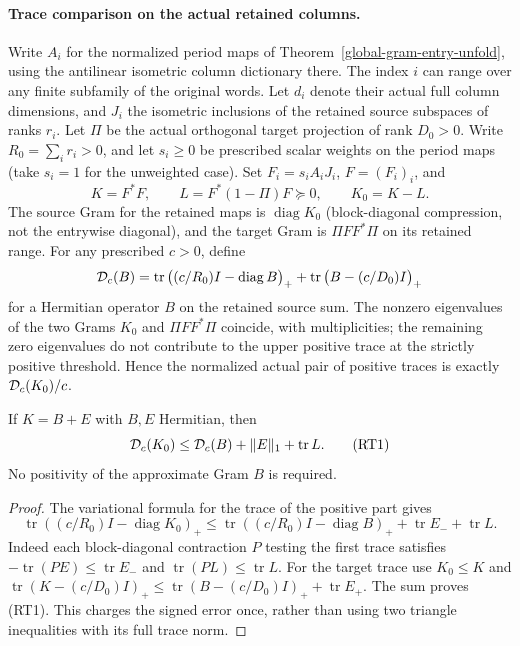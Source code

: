 \paragraph{Trace comparison on the actual retained columns.}
Write \(A_i\) for the normalized period maps of
Theorem~\ref{global-gram-entry-unfold}, using the antilinear
isometric column dictionary there. The index \(i\) can range
over any finite subfamily of the original words.
Let \(d_i\) denote their actual full column dimensions,
and \(J_i\) the isometric inclusions of the retained
source subspaces of ranks \(r_i\). Let \(\Pi\) be the
actual orthogonal target projection of rank \(D_0>0\).
Write \(R_0=\sum_i r_i>0\), and let \(s_i\ge0\) be
prescribed scalar weights on the period maps (take
\(s_i=1\) for the unweighted case). Set
\(F_i=s_i A_iJ_i\), \(F=(F_i)_i\), and
\[
 K=F^*F,\qquad L=F^*(1-\Pi)F\succeq0,\qquad
 K_0=K-L .
\]
The source Gram for the retained maps is \(\operatorname{diag}K_0\)
(block-diagonal compression, not the entrywise diagonal),
and the target Gram is \(\Pi FF^*\Pi\) on its retained range.
For any prescribed \(c>0\), define
\[
 {\cal D}_c(B)=
 \operatorname{tr}\big((c/R_0)I-\operatorname{diag}B\big)_+
 +\operatorname{tr}\big(B-(c/D_0)I\big)_+
\]
for a Hermitian operator \(B\) on the retained source sum.
The nonzero eigenvalues of the two Grams \(K_0\) and
\(\Pi FF^*\Pi\) coincide, with multiplicities; the remaining
zero eigenvalues do not contribute to the upper positive
trace at the strictly positive threshold. Hence the
normalized actual pair of positive traces is exactly
\({\cal D}_c(K_0)/c\).

\begin{lemma}
\label{lem:retained-gram-error-trace}
If \(K=B+E\) with \(B,E\) Hermitian, then
\[
 {\cal D}_c(K_0)\le {\cal D}_c(B)+\|E\|_1+\operatorname{tr}L.
 \tag{RT1}
\]
No positivity of the approximate Gram \(B\) is required.
\end{lemma}
\begin{proof}
The variational formula for the trace of the positive part
gives
\[
 \operatorname{tr}((c/R_0)I-\operatorname{diag}K_0)_+
 \le \operatorname{tr}((c/R_0)I-\operatorname{diag}B)_+
       +\operatorname{tr}E_-+\operatorname{tr}L.
\]
Indeed each block-diagonal contraction \(P\) testing the
first trace satisfies
\(-\operatorname{tr}(PE)\le\operatorname{tr}E_-\) and
\(\operatorname{tr}(PL)\le\operatorname{tr}L\).
For the target trace use \(K_0\le K\) and
\(\operatorname{tr}(K-(c/D_0)I)_+
\le\operatorname{tr}(B-(c/D_0)I)_++\operatorname{tr}E_+\).
The sum proves (RT1). This charges the signed error once,
rather than using two triangle inequalities with its full
trace norm.
\end{proof}

